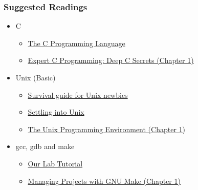 \documentclass{beamer}
\begin{document}
	\begin{frame}
    \frametitle{Suggested Readings}
		\begin{itemize}
        \item \small C
        \begin{itemize}
          \item \small \href{https://www.amazon.com/Programming-Language-Prentice-Hall-Software/dp/0131103628}{The C Programming Language}
          \item \small \href{https://www.amazon.com/Expert-Programming-Peter-van-Linden/dp/0131774298}{Expert C Programming: Deep C Secrets (Chapter 1)}
        \end{itemize}
    \end{itemize}

		\begin{itemize}
        \item \small Unix (Basic) 
				\begin{itemize}
					\item \small \href{http://matt.might.net/articles/basic-unix}{Survival guide for Unix newbies}
					\item \small \href{http://matt.might.net/articles/settling-into-unix}{Settling into Unix}
					\item \small \href{https://www.amazon.com/Unix-Programming-Environment-Prentice-Hall-Software/dp/013937681X}{The Unix Programming Environment (Chapter 1)}
			\end{itemize}	
		\end{itemize}

		\begin{itemize}
        \item \small gcc, gdb and make
        \begin{itemize}
          \item \small \href{http://pages.cs.wisc.edu/~remzi/OSTEP/lab-tutorial.pdf}{Our Lab Tutorial}
          \item \small \href{https://www.amazon.com/Managing-Projects-Make-Nutshell-Handbooks/dp/0596006101}{Managing Projects with GNU Make (Chapter 1)}
        \end{itemize}
    \end{itemize}	
	\end{frame}	
\end{document}
